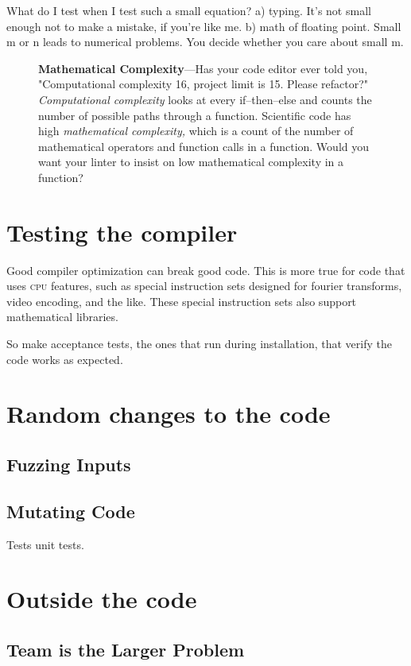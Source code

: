 \documentclass[fleqn,10pt]{olplainarticle}
\newenvironment{callout}
{
\begin{figure}
\begin{center}
\begin{minipage}{0.9\textwidth}
\begin{framed}
}
{
\end{framed}
\end{minipage}
\end{center}
\end{figure}
}
\newcommand{\cpu}{\textsc{cpu}\xspace}
\begin{document}
What do I test when I test such a small equation?
a) typing. It's not small enough not to make a mistake, if you're like me.
b) math of floating point. Small m or n leads to numerical problems.
You decide whether you care about small m.


\begin{callout}
\textbf{Mathematical Complexity}---Has your code editor ever told you,
"Computational complexity 16, project limit is 15. Please refactor?"
\emph{Computational complexity} looks at every if--then--else and counts the
number of possible paths through a function.
Scientific code has high \emph{mathematical complexity,\/} which is a
count of the number of mathematical operators and function calls in
a function. Would you want your linter to insist on low mathematical complexity in
a function?
\end{callout}


\section{Testing the compiler}

Good compiler optimization can break good code.
This is more true for code that uses \cpu features, such as special instruction
sets designed for fourier transforms, video encoding, and the like. These
special instruction sets also support mathematical libraries.

So make acceptance tests, the ones that run during installation, that
verify the code works as expected.


\section{Random changes to the code}
\subsection{Fuzzing Inputs}
\subsection{Mutating Code}
Tests unit tests.

\section{Outside the code}

\subsection{Team is the Larger Problem}
\end{document}
